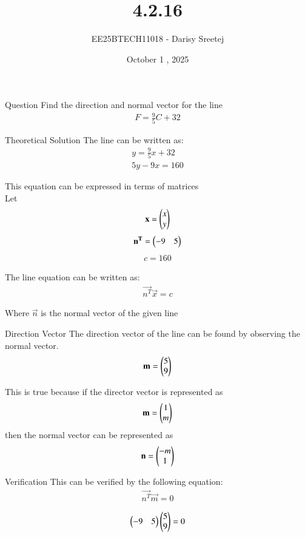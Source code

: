 \documentclass{beamer}
\title %
{4.2.16}
\date{October 1 , 2025}
\author %
{EE25BTECH11018 - Darisy Sreetej}
\begin{document}
\frame{\titlepage}

\begin{frame}{Question}
Find the direction and normal vector for the line 
\begin{align}
F = \frac{9}{5} C + 32
\end{align}
\end{frame}

\begin{frame}{Theoretical Solution}
The line can be written as: 
\begin{align}
y = \frac{9}{5}x+32\\
5y - 9x = 160
\end{align}

This equation can be expressed in terms of matrices\\
Let
\begin{align}
\mathbf{x} = \begin{pmatrix}x \\ y\end{pmatrix}
\end{align}
\begin{align}
\mathbf{n^T} = \begin{pmatrix}-9 & 5\end{pmatrix}
\end{align}
\begin{align}
c = 160
\end{align}

The line equation can be written as:
\begin{align}
\vec{n^T}  \vec{x} = c
\end{align}

Where $\vec{n}$ is the normal vector of the given line
\end{frame}
\begin{frame}{Direction Vector}
The direction vector of the line can be found by observing the normal vector.
\begin{align}
\mathbf{m} = \begin{pmatrix}5 \\ 9\end{pmatrix}
\end{align}


This is true because if the director vector is represented as 
\begin{align}
\mathbf{m}  = \begin{pmatrix}1 \\ m\end{pmatrix}    
\end{align}
then the normal vector can be represented as 
\begin{align}
\mathbf{n} = \begin{pmatrix}-m \\ 1\end{pmatrix}
\end{align}
\end{frame}

\begin{frame}{Verification}
This can be verified by the following equation:
\begin{align}
\vec{n^T}\vec{m} = 0
\end{align}

\begin{align}
\begin{pmatrix}-9 & 5\end{pmatrix}\begin{pmatrix}5 \\ 9\end{pmatrix} = 0
\end{align}\\    
\end{frame}
\end{document}
